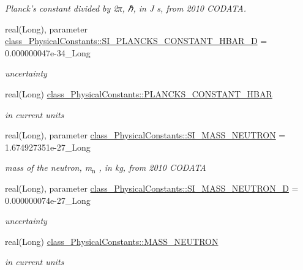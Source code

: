 \begin{DoxyCompactItemize}
\begin{DoxyCompactList}\small\item\em Planck's constant divided by 2π, ℏ, in J s, from 2010 CODATA. \item\end{DoxyCompactList}\item 
real(Long), parameter \hyperlink{namespaceclass__PhysicalConstants_a3d0c994c98a42bfcf113f5b427c36962}{class\_\-PhysicalConstants::SI\_\-PLANCKS\_\-CONSTANT\_\-HBAR\_\-D} = 0.000000047e-\/34\_\-Long
\begin{DoxyCompactList}\small\item\em uncertainty \item\end{DoxyCompactList}\item 
real(Long) \hyperlink{namespaceclass__PhysicalConstants_ae4331c74d5e362ec511a71f7a10d7c5b}{class\_\-PhysicalConstants::PLANCKS\_\-CONSTANT\_\-HBAR}
\begin{DoxyCompactList}\small\item\em in current units \item\end{DoxyCompactList}\item 
real(Long), parameter \hyperlink{namespaceclass__PhysicalConstants_ae630d55c57af72ecd1cf1b926512f9e4}{class\_\-PhysicalConstants::SI\_\-MASS\_\-NEUTRON} = 1.674927351e-\/27\_\-Long
\begin{DoxyCompactList}\small\item\em mass of the neutron, m$_{\mbox{n}}$ , in kg, from 2010 CODATA \item\end{DoxyCompactList}\item 
real(Long), parameter \hyperlink{namespaceclass__PhysicalConstants_a2a2b96dae5b376e21555324d6f18d7b4}{class\_\-PhysicalConstants::SI\_\-MASS\_\-NEUTRON\_\-D} = 0.000000074e-\/27\_\-Long
\begin{DoxyCompactList}\small\item\em uncertainty \item\end{DoxyCompactList}\item 
real(Long) \hyperlink{namespaceclass__PhysicalConstants_af0ecc86a3048c06a15619a67d8a21687}{class\_\-PhysicalConstants::MASS\_\-NEUTRON}
\begin{DoxyCompactList}\small\item\em in current units \item\end{DoxyCompactList}\item 

\end{DoxyCompactItemize}
